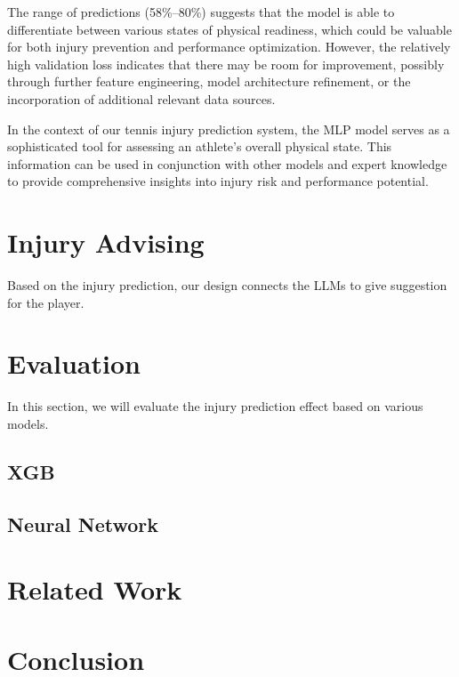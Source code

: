 \documentclass[manuscript,acmsmall,anonymous,review,screen,nonacm=true, authorversion=true]{acmart}
\begin{document}
  The range of predictions (58\%--80\%) suggests that the model is able to differentiate between various states of physical readiness, which could be valuable for both injury prevention and performance optimization. However, the relatively high validation loss indicates that there may be room for improvement, possibly through further feature engineering, model architecture refinement, or the incorporation of additional relevant data sources.

  In the context of our tennis injury prediction system, the MLP model serves as a sophisticated tool for assessing an athlete's overall physical state. This information can be used in conjunction with other models and expert knowledge to provide comprehensive insights into injury risk and performance potential.

\section{Injury Advising}
  Based on the injury prediction, our design connects the LLMs to give suggestion for the player.

\section{Evaluation}
  In this section, we will evaluate the injury prediction effect based on various models.
  \subsection{XGB}
  \subsection{Neural Network}



\section{Related Work}

\section{Conclusion}
\end{document}
